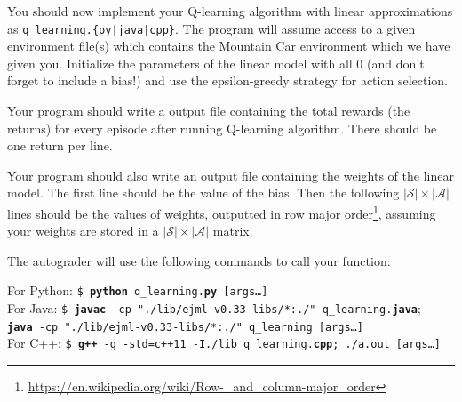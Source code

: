 \documentclass[11pt,addpoints,answers]{exam}
\begin{document}
You should now implement your Q-learning algorithm with linear approximations as \newline\texttt{q\_learning.\{py|java|cpp\}}. The program will assume access to a given environment file(s) which contains the Mountain Car environment which we have given you. Initialize the parameters of the linear model with all 0 (and don't forget to include a bias!) and use the epsilon-greedy strategy for action selection.

Your program should write a output file containing the total rewards (the returns) for every episode after running Q-learning algorithm. There should be one return per line.

Your program should also write an output file containing the weights of the linear model. The first line should be the value of the bias. Then the following $|\mathcal{S}| \times |\mathcal{A}|$ lines should be the values of weights, outputted in row major order\footnote{\url{https://en.wikipedia.org/wiki/Row-_and_column-major_order}}, assuming your weights are stored in a $|\mathcal{S}| \times |\mathcal{A}|$ matrix.

The autograder will use the following commands to call your function:

\begin{tabbing}
For Python: \=\texttt{\$ \textbf{python} q\_learning.\textbf{py} [args\dots]}\\
For Java: \>\texttt{\$ \textbf{javac} -cp "./lib/ejml-v0.33-libs/*:./" q\_learning.\textbf{java}};\\ \>  \texttt{\textbf{java} -cp "./lib/ejml-v0.33-libs/*:./" q\_learning [args\dots]}\\
For C++: \>\texttt{\$ \textbf{g++} -g -std=c++11 -I./lib q\_learning.\textbf{cpp}; ./a.out [args\dots]}\\
\end{tabbing}
\end{document}
